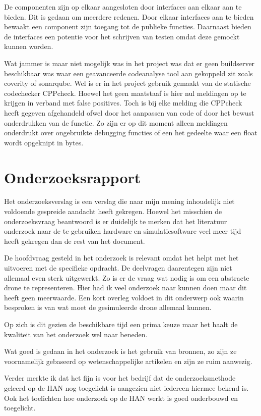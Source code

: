 \documentclass[a4paper, 11pt, oneside]{report}
\begin{document}
De componenten zijn op elkaar aangesloten door interfaces aan elkaar aan te bieden.
Dit is gedaan om meerdere redenen. 
Door elkaar interfaces aan te bieden bewaakt een component zijn toegang tot de publieke functies.
Daarnaast bieden de interfaces een potentie voor het schrijven van testen omdat deze gemockt kunnen worden.  

Wat jammer is maar niet mogelijk was in het project was dat er geen buildserver beschikbaar was waar een geavanceerde codeanalyse tool aan gekoppeld zit zoals coverity of sonarqube. Wel is er in het project gebruik gemaakt van de statische codechecker CPPcheck. Hoewel het geen maatstaaf is hier nul meldingen op te krijgen in verband met false positives. 
Toch is bij elke melding die CPPcheck heeft gegeven afgehandeld ofwel door het aanpassen van code of door het bewust onderdrukken van de functie. Zo zijn er op dit moment alleen meldingen onderdrukt over ongebruikte debugging functies of een het gedeelte waar een float wordt opgeknipt in bytes.
  
\section{Onderzoeksrapport}\label{sec:onderzoeksrapport}

Het onderzoeksverslag is een verslag die naar mijn mening inhoudelijk niet voldoende gespreide aandacht heeft gekregen. Hoewel het misschien de onderzoeksvraag beantwoord is er duidelijk te merken dat het literatuur onderzoek naar de te gebruiken hardware en simulatiesoftware veel meer tijd heeft gekregen dan de rest van het document.

De hoofdvraag gesteld in het onderzoek is relevant omdat het helpt met het uitvoeren met de specifieke opdracht.
De deelvragen daarentegen zijn niet allemaal even sterk uitgewerkt. 
Zo is er de vraag wat nodig is om een abstracte drone te representeren. 
Hier had ik veel onderzoek naar kunnen doen maar dit heeft geen meerwaarde. 
Een kort overleg voldoet in dit onderwerp ook waarin besproken is van wat moet de gesimuleerde drone allemaal kunnen.

Op zich is dit gezien de beschikbare tijd een prima keuze maar het haalt de kwaliteit van het onderzoek wel naar beneden.

Wat goed is gedaan in het onderzoek is het gebruik van bronnen, zo zijn ze voornamelijk gebaseerd op wetenschappelijke artikelen en zijn ze ruim aanwezig.

Verder merkte ik dat het fijn is voor het bedrijf dat de onderzoeksmethode geleerd op de HAN nog toegelicht is aangezien niet iedereen hiermee bekend is. Ook het toelichten hoe onderzoek op de HAN werkt is goed onderbouwd en toegelicht.
  
\end{document}
